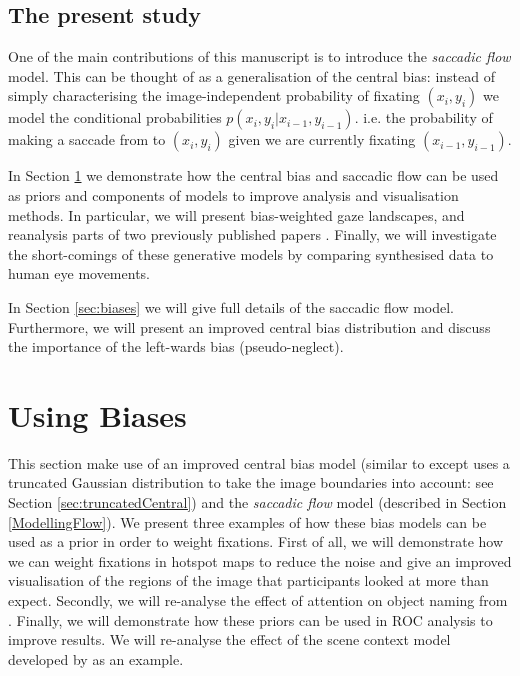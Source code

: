 \documentclass[a4paper, twocolumn, oneside, 10pt]{article}
\begin{document}
\subsection{The present study}

One of the main contributions of this manuscript is to introduce the \textit{saccadic flow} model. This can be thought of as a generalisation of the central bias: instead of simply characterising the image-independent probability of fixating $(x_i, y_i)$ we model the conditional probabilities $p(x_i,y_i|x_{i-1}, y_{i-1})$. i.e. the probability of making a saccade from to $(x_i,y_i)$ given we are currently fixating $(x_{i-1}, y_{i-1})$.

In Section \ref{sec:usingbiaes} we demonstrate how the central bias and saccadic flow can be used as priors and components of models to improve analysis and visualisation methods. In particular, we will present bias-weighted gaze landscapes, and reanalysis parts of two previously published papers \citep{clarke2013,ehinger2009}. Finally, we will investigate the short-comings of these generative models by comparing synthesised data to human eye movements. 

In Section \ref{sec:biases} we will give full details of the saccadic flow model. Furthermore, we will present an improved central bias distribution and discuss the importance of the left-wards bias (pseudo-neglect).

\section{Using Biases}
\label{sec:usingbiaes}

This section make use of an improved central bias model (similar to \cite{clarke-tatler2014} except uses a truncated Gaussian distribution to take the image boundaries into account: see Section \ref{sec:truncatedCentral}) and the \textit{saccadic flow} model (described in Section \ref{ModellingFlow}). We present three examples of how these bias models can be used as a prior in order to weight fixations. First of all, we will demonstrate how we can weight fixations in hotspot maps to reduce the noise and give an improved visualisation of the regions of the image that participants looked at more than expect. Secondly, we will re-analyse the effect of attention on object naming from \cite{clarke2013}.  Finally, we will demonstrate how these priors can be used in ROC analysis to improve results. We will re-analyse the effect of the scene context model developed by  \cite{ehinger2009} as an example. 
\end{document}
